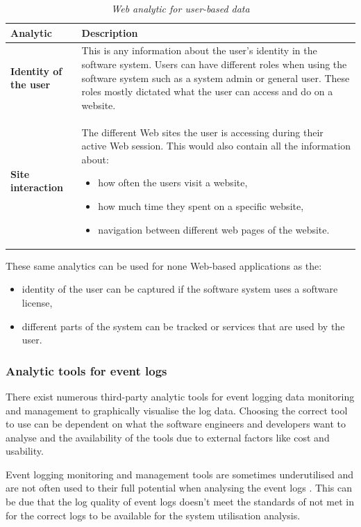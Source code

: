 \begin{table}[!htb]
	\centering
	\caption[Web analytic for user-based data]
	{\textit{Web analytic for user-based data}}
	\label{tbl:ch1_webAnalytics}
	\begin{tabularx}{\textwidth}{|l|X|}
		\hline \textbf{Analytic}  & \textbf{Description} \\
		\hline \textbf{Identity of the user} & This is any information about the user's identity in the software system. Users can have different roles when using the software system such as a system admin or general user. These roles mostly dictated what the user can access and do on a website. \\
		\hline \textbf{Site interaction} & The different Web sites the user is accessing during their active Web session. This would also contain all the information about: 
		\begin{itemize}
			\item how often the users visit a website,
			\item how much time they spent on a specific website,
			\item navigation between different web pages of the website.
		\end{itemize}
		\\
		\hline
	\end{tabularx}
\end{table}

These same analytics can be used for none Web-based applications as the: 
\begin{itemize}
	\item identity of the user can be captured if the software system uses a software license,
	\item different parts of the system can be tracked or services that are used by the user.
\end{itemize} 

\subsubsection{Analytic tools for event logs}
There exist numerous third-party analytic tools for event logging data monitoring and management to graphically visualise the log data. Choosing the correct tool to use can be dependent on what the software engineers and developers want to analyse and the availability of the tools due to external factors like cost and usability. \par Event logging monitoring and management tools are sometimes underutilised and are not often used to their full potential when analysing the event logs \cite{Fedaghi2010}. This can be due that the log quality of event logs doesn't meet the standards of  not met in  for the correct logs to be available for the system utilisation analysis.  


